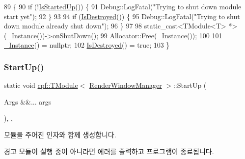\begin{DoxyCode}
89                                \{
90             \textcolor{keywordflow}{if} (!\hyperlink{classcpf_1_1_t_module_a73732afee7131dad652bf3e00c75cef9}{IsStartedUp}()) \{
91                 Debug::LogFatal(\textcolor{stringliteral}{"Trying to shut down module start yet"});
92             \}
93 
94             \textcolor{keywordflow}{if} (\hyperlink{classcpf_1_1_t_module_a9f70f0a70ac59b13b7a874f82c877337}{IsDestroyed}()) \{
95                 Debug::LogFatal(\textcolor{stringliteral}{"Trying to shut down module already shut down"});
96             \}
97 
98             \textcolor{keyword}{static\_cast<}TModule<T> *\textcolor{keyword}{>}(\hyperlink{classcpf_1_1_t_module_a06ab8af8ea6b294959937fd2bbc1e615}{\_Instance}())->\hyperlink{classcpf_1_1_t_module_a15c93b1aca54022e145961bea8e3ea7d}{onShutDown}();
99             Allocator::Free(\hyperlink{classcpf_1_1_t_module_a06ab8af8ea6b294959937fd2bbc1e615}{\_Instance}());
100 
101             \hyperlink{classcpf_1_1_t_module_a06ab8af8ea6b294959937fd2bbc1e615}{\_Instance}() = \textcolor{keyword}{nullptr};
102             \hyperlink{classcpf_1_1_t_module_a9f70f0a70ac59b13b7a874f82c877337}{IsDestroyed}() = \textcolor{keyword}{true};
103         \}
\end{DoxyCode}
\mbox{\label{classcpf_1_1_t_module_a02fbf3c4d28a3328e81b0e8d0bdd93b0}} 
\subsubsection{\texorpdfstring{Start\+Up()}{StartUp()}\hspace{0.1cm}{\footnotesize\ttfamily [1/2]}}
{\footnotesize\ttfamily static void \hyperlink{classcpf_1_1_t_module}{cpf\+::\+T\+Module}$<$ \hyperlink{classcpf_1_1_render_window_manager}{Render\+Window\+Manager}  $>$\+::Start\+Up (\begin{DoxyParamCaption}\item[{Args \&\&...}]{args }\end{DoxyParamCaption})\hspace{0.3cm}{\ttfamily [inline]}, {\ttfamily [static]}, {\ttfamily [inherited]}}

모듈을 주어진 인자와 함께 생성합니다. \begin{DoxyWarning}{경고}
모듈이 실행 중이 아니라면 에러를 출력하고 프로그램이 종료됩니다. 
\end{DoxyWarning}


